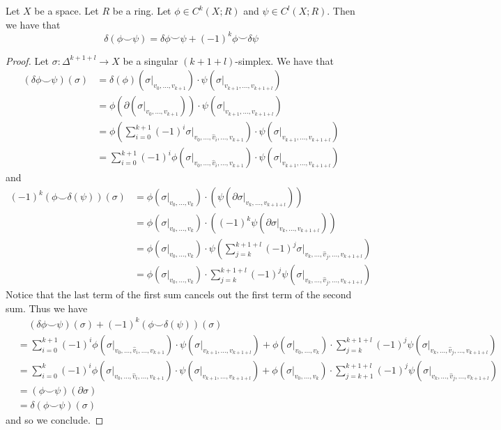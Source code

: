 \documentclass[a4paper]{article}
\begin{document}
\begin{lmm}{}{} Let $X$ be a space. Let $R$ be a ring. Let $\phi\in C^k(X;R)$ and $\psi\in C^l(X;R)$. Then we have that $$\delta(\phi\smile\psi)=\delta\phi\smile\psi+(-1)^k\phi\smile\delta\psi$$ 
\begin{proof}
Let $\sigma:\Delta^{k+1+l}\to X$ be a singular $(k+1+l)$-simplex. We have that 
\begin{align*}
(\delta\phi\smile\psi)(\sigma)&=\delta(\phi)(\sigma|_{v_0,\dots,v_{k+1}})\cdot\psi(\sigma|_{v_{k+1},\dots,v_{k+1+l}})\\
&=\phi(\partial(\sigma|_{v_0,\dots,v_{k+1}}))\cdot\psi(\sigma|_{v_{k+1},\dots,v_{k+1+l}})\\
&=\phi\left(\sum_{i=0}^{k+1}(-1)^i\sigma|_{v_0,\dots,\hat{v}_i,\dots,v_{k+1}}\right)\cdot\psi(\sigma|_{v_{k+1},\dots,v_{k+1+l}})\\
&=\sum_{i=0}^{k+1}(-1)^i\phi(\sigma|_{v_0,\dots,\hat{v}_i,\dots,v_{k+1}})\cdot\psi(\sigma|_{v_{k+1},\dots,v_{k+1+l}})
\end{align*}
and 
\begin{align*}
(-1)^k\left(\phi\smile\delta(\psi)\right)(\sigma)&=\phi(\sigma|_{v_0,\dots,v_k})\cdot(\psi(\partial\sigma|_{v_k,\dots,v_{k+1+l}}))\\
&=\phi(\sigma|_{v_0,\dots,v_k})\cdot((-1)^k\psi(\partial\sigma|_{v_k,\dots,v_{k+1+l}}))\\
&=\phi(\sigma|_{v_0,\dots,v_k})\cdot\psi\left(\sum_{j=k}^{k+1+l}(-1)^j\sigma|_{v_k,\dots,\hat{v}_j,\dots,v_{k+1+l}}\right)\\
&=\phi(\sigma|_{v_0,\dots,v_k})\cdot\sum_{j=k}^{k+1+l}(-1)^j\psi(\sigma|_{v_k,\dots,\hat{v}_j,\dots,v_{k+1+l}})
\end{align*}
Notice that the last term of the first sum cancels out the first term of the second sum. Thus we have 
\begin{align*}
&\;\;\;\;(\delta\phi\smile\psi)(\sigma)+(-1)^k\left(\phi\smile\delta(\psi)\right)(\sigma)\\
&=\sum_{i=0}^{k+1}(-1)^i\phi(\sigma|_{v_0,\dots,\hat{v}_i,\dots,v_{k+1}})\cdot\psi(\sigma|_{v_{k+1},\dots,v_{k+1+l}})+\phi(\sigma|_{v_0,\dots,v_k})\cdot\sum_{j=k}^{k+1+l}(-1)^j\psi(\sigma|_{v_k,\dots,\hat{v}_j,\dots,v_{k+1+l}})\\
&=\sum_{i=0}^k(-1)^i\phi(\sigma|_{v_0,\dots,\hat{v}_i,\dots,v_{k+1}})\cdot\psi(\sigma|_{v_{k+1},\dots,v_{k+1+l}})+\phi(\sigma|_{v_0,\dots,v_k})\cdot\sum_{j=k+1}^{k+1+l}(-1)^j\psi(\sigma|_{v_k,\dots,\hat{v}_j,\dots,v_{k+1+l}})\\
&=(\phi\smile\psi)(\partial\sigma)\\
&=\delta(\phi\smile\psi)(\sigma)
\end{align*}
and so we conclude. 
\end{proof}
\end{lmm}
\end{document}
